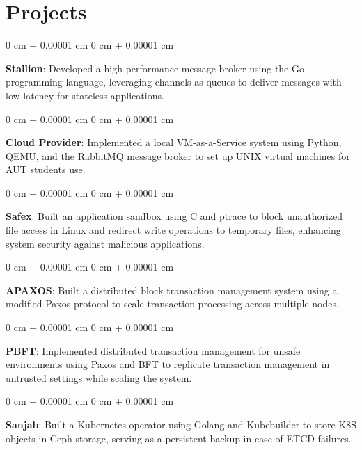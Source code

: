 \documentclass[10pt, letterpaper]{article}
\newenvironment{onecolentry}{
    \begin{adjustwidth}{
        0 cm + 0.00001 cm
    }{
        0 cm + 0.00001 cm
    }
}{
    \end{adjustwidth}
} %
\begin{document}
    \section{Projects}    
        \begin{onecolentry}
            \noindent\justifying
            \textbf{Stallion}: Developed a high-performance message broker using the Go programming language, leveraging channels as queues to deliver messages with low latency for stateless applications.
        \end{onecolentry}
        \vspace{0.1 cm}
        \begin{onecolentry}
            \noindent\justifying
            \textbf{Cloud Provider}: Implemented a local VM-as-a-Service system using Python, QEMU, and the RabbitMQ message broker to set up UNIX virtual machines for AUT students use.
        \end{onecolentry}
        \vspace{0.1 cm}
        \begin{onecolentry}
            \noindent\justifying
            \textbf{Safex}: Built an application sandbox using C and ptrace to block unauthorized file access in Linux and redirect write operations to temporary files, enhancing system security against malicious applications.
        \end{onecolentry}
        \vspace{0.1 cm}
        \begin{onecolentry}
            \noindent\justifying
            \textbf{APAXOS}: Built a distributed block transaction management system using a modified Paxos protocol to scale transaction processing across multiple nodes.
        \end{onecolentry}
            \vspace{0.1 cm}
        \begin{onecolentry}
            \noindent\justifying
            \textbf{PBFT}: Implemented distributed transaction management for unsafe environments using Paxos and BFT to replicate transaction management in untrusted settings while scaling the system.
        \end{onecolentry}
        \vspace{0.1 cm}
        \begin{onecolentry}
            \noindent\justifying
            \textbf{Sanjab}: Built a Kubernetes operator using Golang and Kubebuilder to store K8S objects in Ceph storage, serving as a persistent backup in case of ETCD failures.
        \end{onecolentry}
\end{document}
